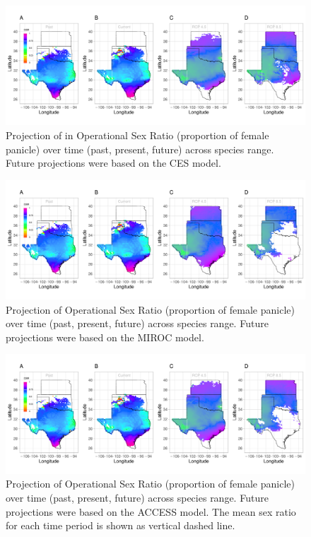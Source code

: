 \documentclass[12pt]{article}\usepackage[]{graphicx}\usepackage[dvipsnames]{xcolor}
\begin{document}
\begin{figure}[H]
	\begin{center}
		\includegraphics[width=1\linewidth]{Figures/Fig_geo_sr_ces.pdf}
		\caption{Projection of in Operational Sex Ratio (proportion of female panicle) over  time (past, present, future) across species range.
			Future projections were based on the CES model.
			}
		\label{Sup:geoosrprojces}
	\end{center}
\end{figure}

\begin{figure}[H]
	\begin{center}
		\includegraphics[width=1\linewidth]{Figures/Fig_geo_sr_miroc.pdf}
		\caption{Projection of Operational Sex Ratio (proportion of female panicle) over time (past, present, future) across species range.
			Future projections were based on the MIROC model.
			}
		\label{Sup:geoosrprojmiroc}
	\end{center}
\end{figure}


\begin{figure}[H]
	\begin{center}
		\includegraphics[width=1\linewidth]{Figures/Fig_geo_sr_acc.pdf}
		\caption{Projection  of Operational Sex Ratio (proportion of female panicle) over time (past, present, future) across species range.
			Future projections were based on the ACCESS  model.
			The mean sex ratio for each time period is shown as vertical dashed line.}
		\label{Sup:geoosrprojacc}
	\end{center}
\end{figure}
\end{document}
